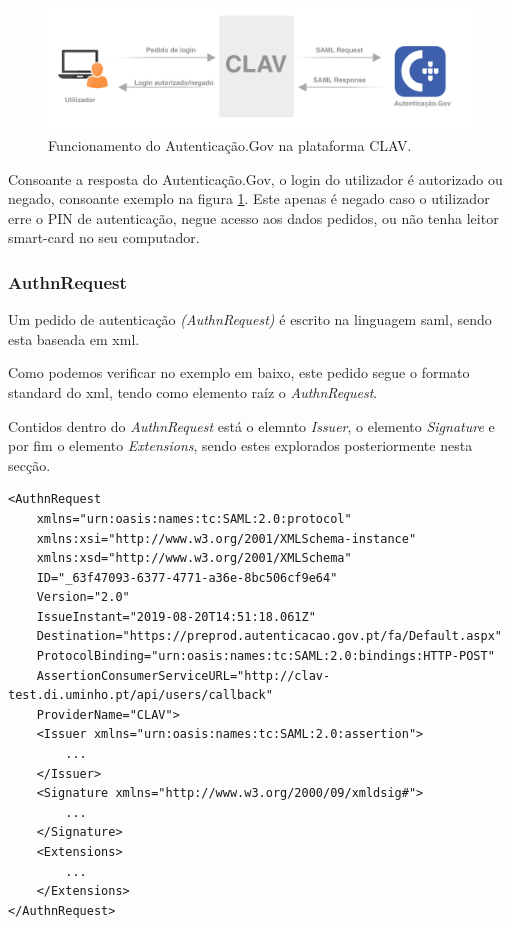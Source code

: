 \begin{figure}[h]
    \centering
    \includegraphics[width=\textwidth]{img/saml/clavflow.png}
    \caption{Funcionamento do Autenticação.Gov na plataforma CLAV.}
    \label{clavflow}
\end{figure}

Consoante a resposta do Autenticação.Gov, o login do utilizador é autorizado ou negado, consoante exemplo na figura \ref{clavflow}.
Este apenas é negado caso o utilizador erre o PIN de autenticação, negue acesso aos dados pedidos, ou não tenha leitor smart-card no seu computador.

\cleardoublepage
\subsubsection{AuthnRequest} \label{authnRequestSection}

Um pedido de autenticação \emph{(AuthnRequest)} é escrito na linguagem \gls{saml}, sendo esta baseada em \gls{xml}.

Como podemos verificar no exemplo em baixo, este pedido segue o formato standard do \gls{xml}, tendo como elemento raíz o \emph{AuthnRequest}.

Contidos dentro do \emph{AuthnRequest} está o elemnto \emph{Issuer}, o elemento \emph{Signature} e por fim o elemento \emph{Extensions}, sendo estes explorados posteriormente nesta secção.

\begin{lstlisting}
<AuthnRequest 
    xmlns="urn:oasis:names:tc:SAML:2.0:protocol"
    xmlns:xsi="http://www.w3.org/2001/XMLSchema-instance"
    xmlns:xsd="http://www.w3.org/2001/XMLSchema"
    ID="_63f47093-6377-4771-a36e-8bc506cf9e64"
    Version="2.0"
    IssueInstant="2019-08-20T14:51:18.061Z"
    Destination="https://preprod.autenticacao.gov.pt/fa/Default.aspx"
    ProtocolBinding="urn:oasis:names:tc:SAML:2.0:bindings:HTTP-POST"
    AssertionConsumerServiceURL="http://clav-test.di.uminho.pt/api/users/callback"
    ProviderName="CLAV">
    <Issuer xmlns="urn:oasis:names:tc:SAML:2.0:assertion">
        ...
    </Issuer>
    <Signature xmlns="http://www.w3.org/2000/09/xmldsig#">
        ...
    </Signature>
    <Extensions>
        ...
    </Extensions>
</AuthnRequest>
\end{lstlisting}

